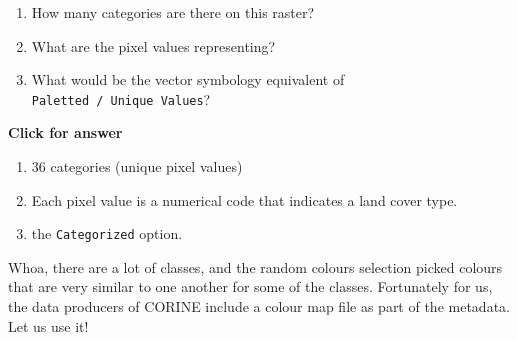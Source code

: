 \documentclass[
  letterpaper,
  DIV=11,
  numbers=noendperiod]{scrreprt}
\begin{document}
\begin{tcolorbox}[enhanced jigsaw, breakable, toptitle=1mm, colback=white, left=2mm, leftrule=.75mm, titlerule=0mm, colframe=quarto-callout-important-color-frame, opacityback=0, title=\textcolor{quarto-callout-important-color}{\faExclamation}\hspace{0.5em}{Stop and Think}, toprule=.15mm, opacitybacktitle=0.6, bottomtitle=1mm, colbacktitle=quarto-callout-important-color!10!white, bottomrule=.15mm, coltitle=black, rightrule=.15mm, arc=.35mm]

\begin{enumerate}
\def\labelenumi{\alph{enumi})}
\item
  How many categories are there on this raster?
\item
  What are the pixel values representing?
\item
  What would be the vector symbology equivalent of
  \texttt{Paletted\ /\ Unique\ Values}?
\end{enumerate}

\end{tcolorbox}

\begin{tcolorbox}[enhanced jigsaw, leftrule=.75mm, colframe=quarto-callout-important-color-frame, breakable, toprule=.15mm, bottomrule=.15mm, arc=.35mm, rightrule=.15mm, opacityback=0, colback=white, left=2mm]

\vspace{-3mm}\textbf{Click for answer}\vspace{3mm}

\begin{enumerate}
\def\labelenumi{\alph{enumi})}
\item
  36 categories (unique pixel values)
\item
  Each pixel value is a numerical code that indicates a land cover type.
\item
  the \texttt{Categorized} option.
\end{enumerate}

\end{tcolorbox}

Whoa, there are a lot of classes, and the random colours selection
picked colours that are very similar to one another for some of the
classes. Fortunately for us, the data producers of CORINE include a
colour map file as part of the metadata. Let us use it!
\end{document}
